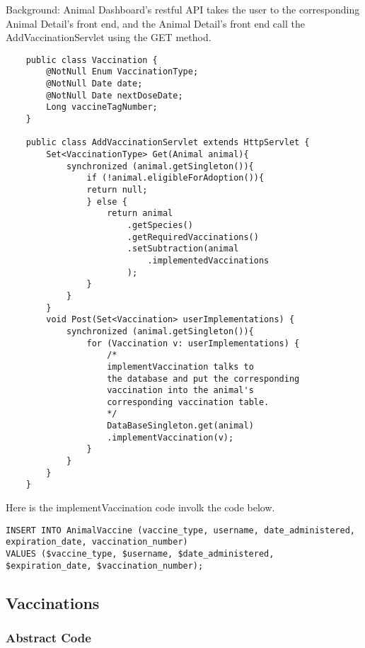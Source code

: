 \documentclass[a4paper]{article}
\begin{document}
Background: Animal Dashboard's restful API takes the user to the corresponding Animal Detail's front end, and the Animal Detail's front end call the AddVaccinationServlet using the GET method.


\begin{lstlisting}
	public class Vaccination {
		@NotNull Enum VaccinationType;
		@NotNull Date date;
		@NotNull Date nextDoseDate;
		Long vaccineTagNumber;
	}

	public class AddVaccinationServlet extends HttpServlet {
		Set<VaccinationType> Get(Animal animal){
			synchronized (animal.getSingleton()){
				if (!animal.eligibleForAdoption()){
				return null;
				} else {
					return animal
						.getSpecies()
						.getRequiredVaccinations()
						.setSubtraction(animal
							.implementedVaccinations
						);
				}
			}
		}
		void Post(Set<Vaccination> userImplementations) {
			synchronized (animal.getSingleton()){
				for (Vaccination v: userImplementations) {
					/*
					implementVaccination talks to
					the database and put the corresponding
					vaccination into the animal's
					corresponding vaccination table.
					*/
					DataBaseSingleton.get(animal)
					.implementVaccination(v);
				}
			}
		}
	}
\end{lstlisting}

Here is the implementVaccination code involk the code below.

\begin{lstlisting}
INSERT INTO AnimalVaccine (vaccine_type, username, date_administered, expiration_date, vaccination_number)
VALUES ($vaccine_type, $username, $date_administered, $expiration_date, $vaccination_number);
\end{lstlisting}



\hypertarget{vaccinations}{\subsection{Vaccinations}}

\subsubsection*{Abstract Code}
\end{document}
